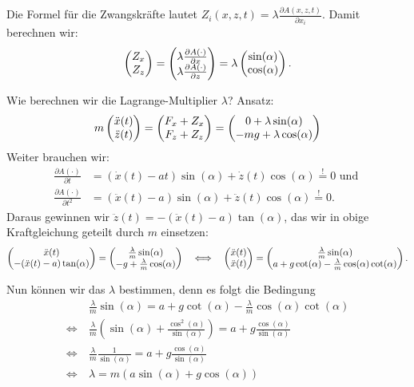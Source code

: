 Die Formel für die Zwangskräfte lautet $Z_i(x, z, t) = \lambda \frac{\partial A(x, z, t)}{\partial x_i}$. Damit berechnen wir:
\[
	\begin{pmatrix} Z_x \\ Z_z \end{pmatrix} 
	= \begin{pmatrix} \lambda \frac{\partial A(\cdot)}{\partial x} \\ \lambda \frac{\partial A(\cdot)}{\partial z} \end{pmatrix}
	= \lambda \begin{pmatrix} \sin(\alpha) \\ \cos(\alpha) \end{pmatrix}
	\text{.}
\]

Wie berechnen wir die Lagrange-Multiplier $\lambda$? Ansatz:
\[
	m \begin{pmatrix} \ddot{x}(t) \\ \ddot{z}(t) \end{pmatrix} 
	= \begin{pmatrix} F_x + Z_x \\ F_z + Z_z \end{pmatrix}
	= \begin{pmatrix} 0 + \lambda \sin(\alpha) \\ -mg + \lambda \cos(\alpha) \end{pmatrix}
\]
Weiter brauchen wir: 
\begin{align*}
	\frac{\partial A(\cdot)}{\partial t} &= \left( \dot{x}(t) - at \right) \sin(\alpha) + \dot{z}(t) \cos(\alpha) \overset{!}{=} 0 \text{ und } \\
	\frac{\partial A(\cdot)}{\partial t^2} &= \left( \ddot{x}(t) - a \right) \sin(\alpha) + \ddot{z}(t) \cos(\alpha) \overset{!}{=} 0
	\text{.}
\end{align*}
Daraus gewinnen wir $\ddot{z}(t) = - (\ddot{x}(t) - a) \tan(\alpha)$, das wir in obige Kraftgleichung geteilt durch $m$ einsetzen:
\[
	\begin{pmatrix} \ddot{x}(t) \\ -(\ddot{x}(t) - a) \tan(\alpha) \end{pmatrix}
	= \begin{pmatrix}  \frac{\lambda}{m} \sin(\alpha) \\ -g + \frac{\lambda}{m} \cos(\alpha)  \end{pmatrix}
	\quad \Longleftrightarrow \quad 
	\begin{pmatrix} \ddot{x}(t) \\ \ddot{x}(t) \end{pmatrix} = \begin{pmatrix}  \frac{\lambda}{m} \sin(\alpha) \\ a + g \cot(\alpha) - \frac{\lambda}{m}  \cos(\alpha) \cot(\alpha)  \end{pmatrix}
	\text{.}
\]

Nun können wir das $\lambda$ bestimmen, denn es folgt die Bedingung
\begin{align*}
	& \frac{\lambda}{m} \sin(\alpha) = a + g \cot(\alpha) - \frac{\lambda}{m} \cos(\alpha) \cot(\alpha) \\
	\Longleftrightarrow~ & \frac{\lambda}{m} \left( \sin(\alpha) + \frac{\cos^2(\alpha)}{\sin(\alpha)} \right) = a + g \frac{\cos(\alpha)}{\sin(\alpha)} \\
	\Longleftrightarrow~ & \frac{\lambda}{m} \frac{1}{\sin(\alpha)} = a + g \frac{\cos(\alpha)}{\sin(\alpha)} \\
	\Longleftrightarrow~ & \lambda = m ( a \sin(\alpha) + g \cos(\alpha) )	
\end{align*}

